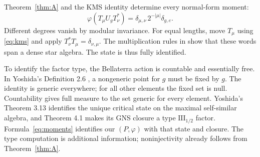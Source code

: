 Theorem~\ref{thm:A} and the KMS identity determine every normal-form moment:
\begin{equation}\label{eq:moments}
 \varphi(T_\mu U_gT_\nu^*)
       =\delta_{\mu,\nu}\,2^{-|\mu|}\delta_{g,e}.
\end{equation}
Different degrees vanish by modular invariance. For equal lengths, move $T_\mu$ using \eqref{eq:kms} and apply $T_\nu^*T_\mu=\delta_{\nu,\mu}$. The multiplication rules in \cite[Lemma 3.4]{LRRW} show that these words span a dense star algebra. The state is thus fully identified.

To identify the factor type, the Bellaterra action is countable and essentially free. In Yoshida's Definition 2.6 \cite{Yoshida}, a nongeneric point for $g$ must be fixed by $g$. The identity is generic everywhere; for all other elements the fixed set is null. Countability gives full measure to the set generic for every element. Yoshida's Theorem 3.13 identifies the unique critical state on the maximal self-similar algebra, and Theorem 4.1 makes its GNS closure a type $\mathrm{III}_{1/2}$ factor. Formula~\eqref{eq:moments} identifies our $(P,\varphi)$ with that state and closure. The type computation is additional information; noninjectivity already follows from Theorem~\ref{thm:A}.

